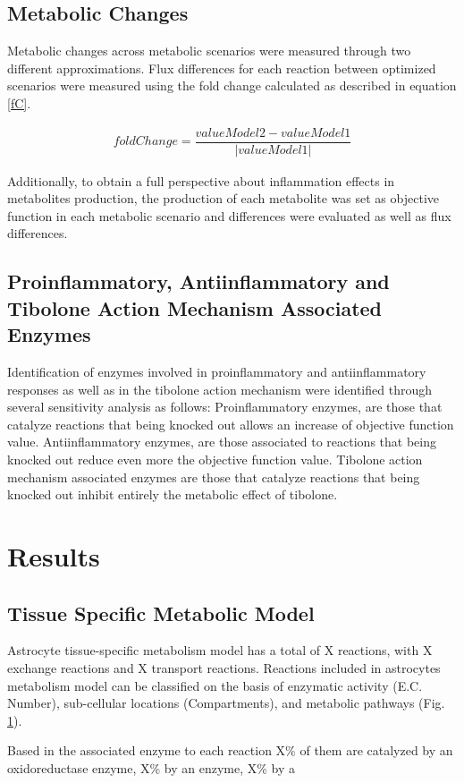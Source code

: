 \subsection*{Metabolic Changes}
Metabolic changes across metabolic scenarios were measured through two different approximations. Flux differences for each reaction between optimized scenarios were measured using the fold change calculated as described in equation \ref{fC}.
\begin{ceqn}
\begin{align}
\label{fC}
   foldChange = \dfrac{valueModel2-valueModel1}{\left|valueModel1\right|}
\end{align}
\end{ceqn}
Additionally, to obtain a full perspective about inflammation effects in metabolites production, the production of each metabolite was set as objective function in each metabolic scenario and differences were evaluated as well as flux differences.
\subsection*{Proinflammatory, Antiinflammatory and Tibolone Action Mechanism Associated Enzymes}
Identification of enzymes involved in proinflammatory and antiinflammatory responses as well as in the tibolone action mechanism were identified through several sensitivity analysis as follows: Proinflammatory enzymes, are those that catalyze reactions that being knocked out allows an increase of objective function value. Antiinflammatory enzymes, are those associated to reactions that being knocked out reduce even more the objective function value. Tibolone action mechanism associated enzymes are those that catalyze reactions that being knocked out inhibit entirely the metabolic effect of tibolone.
\section{Results}
\subsection*{Tissue Specific Metabolic Model}
Astrocyte tissue-specific metabolism model has a total of X reactions, with X exchange reactions and X transport reactions. Reactions included in astrocytes metabolism model can be classified on the basis of enzymatic activity (E.C. Number), sub-cellular locations (Compartments), and metabolic pathways (Fig. \ref{}). 

Based in the associated enzyme to each reaction X\% of them are catalyzed by an oxidoreductase enzyme, X\% by an enzyme, X\% by a

